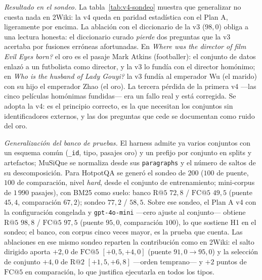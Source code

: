 \documentclass[11pt,a4paper]{article}
\begin{document}
\emph{Resultado en el sondeo.} La tabla~\ref{tab:v4-sondeo} muestra que
generalizar no cuesta nada en 2Wiki: la v4 queda en paridad estadística con
el Plan A, ligeramente por encima. La ablación con el diccionario de la v3
($98{,}0$) obliga a una lectura honesta: el diccionario curado \emph{pierde}
dos preguntas que la v3 acertaba por fusiones erróneas afortunadas. En
\guillemotleft{}\emph{Where was the director of film Evil Eyes born?}\guillemotright{} el oro es el
pasaje \guillemotleft{}Mark Atkins (footballer)\guillemotright{}: el conjunto de datos enlazó a un
futbolista como director, y la v3 lo fundía con el director homónimo; en
\guillemotleft{}\emph{Who is the husband of Lady Gouyi?}\guillemotright{} la v3 fundía al emperador Wu (el
marido) con su hijo el emperador Zhao (el oro). La tercera pérdida de la
primera v4 ---las cinco películas homónimas fundidas--- era un fallo real y
está corregida. Se adopta la v4: es el principio correcto, es la que
necesitan los conjuntos sin identificadores externos, y las dos preguntas
que cede se documentan como ruido del oro.

\emph{Generalización del banco de pruebas.} El harness admite ya varios
conjuntos con un esquema común (\texttt{\_id}, tipo, pasajes oro) y un
prefijo por conjunto en splits y artefactos; MuSiQue se normaliza desde sus
\texttt{paragraphs} y el número de saltos de su descomposición. Para HotpotQA
se generó el sondeo de $200$ ($100$ de puente, $100$ de comparación, nivel
\emph{hard}, desde el conjunto de entrenamiento; mini-corpus de $1\,990$
pasajes), con BM25 como suelo: banco $\mathrm{R@}5$ $72{,}8$ / $\mathrm{FC@}5$
$49{,}5$ (puente $45{,}4$, comparación $67{,}2$); sondeo $77{,}2$ /
$58{,}5$. Sobre ese sondeo, el Plan A v4 con la configuración congelada y
\texttt{gpt-4o-mini} ---cero ajuste al conjunto--- obtiene $\mathrm{R@}5$
$98{,}8$ / $\mathrm{FC@}5$ $97{,}5$ (puente $95{,}0$, comparación $100$), lo
que sostiene H1 en el sondeo; el banco, con corpus cinco veces mayor, es la
prueba que cuenta. Las ablaciones en ese mismo sondeo reparten la
contribución como en 2Wiki: el salto dirigido aporta $+2{,}0$ de
$\mathrm{FC@}5$ $[+0{,}5,+4{,}0]$ (puente $91{,}0 \to 95{,}0$) y la selección
de conjunto $+4{,}0$ de $\mathrm{R@}2$ $[+1{,}5,+6{,}8]$ ---orden temprano--- y
$+2$ puntos de $\mathrm{FC@}5$ en comparación, lo que justifica ejecutarla en
todos los tipos. 
\end{document}
